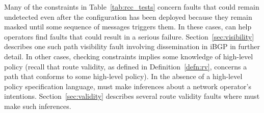 Many of the constraints in Table~\ref{tab:rcc_tests} concern faults that
could remain undetected even after the configuration has been deployed
because they remain masked until some sequence of messages triggers
them. In these cases, \rcc can help operators find faults that could
result in a serious failure.  Section~\ref{sec:visibility} describes one
such path visibility fault involving dissemination in iBGP in further
detail. 
%
In other cases, checking constraints implies some knowledge of high-level
policy (recall that route validity, as defined in
Definition~\ref{defn:rv}, concerns a path that conforms to some 
high-level policy).  In the absence of a high-level policy specification
language, 
\rcc must make inferences about a network operator's intentions.
Section~\ref{sec:validity} describes several route validity faults where
\rcc must make such inferences.












